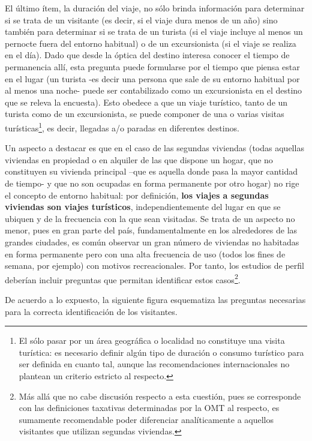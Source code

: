 \documentclass[
]{book}
\begin{document}
El último ítem, la duración del viaje, no sólo brinda información para determinar si se trata de un visitante (es decir, si el viaje dura menos de un año) sino también para determinar si se trata de un turista (si el viaje incluye al menos un pernocte fuera del entorno habitual) o de un excursionista (si el viaje se realiza en el día). Dado que desde la óptica del destino interesa conocer el tiempo de permanencia allí, esta pregunta puede formularse por el tiempo que piensa estar en el lugar (un turista -es decir una persona que sale de su entorno habitual por al menos una noche- puede ser contabilizado como un excursionista en el destino que se releva la encuesta). Esto obedece a que un viaje turístico, tanto de un turista como de un excursionista, se puede componer de una o varias visitas turísticas\footnote{El sólo pasar por un área geográfica o localidad no constituye una visita turística: es necesario definir algún tipo de duración o consumo turístico para ser definida en cuanto tal, aunque las recomendaciones internacionales no plantean un criterio estricto al respecto.}, es decir, llegadas a/o paradas en diferentes destinos.

Un aspecto a destacar es que en el caso de las segundas viviendas (todas aquellas viviendas en propiedad o en alquiler de las que dispone un hogar, que no constituyen su vivienda principal --que es aquella donde pasa la mayor cantidad de tiempo- y que no son ocupadas en forma permanente por otro hogar) no rige el concepto de entorno habitual: por definición, \textbf{los viajes a segundas viviendas son viajes turísticos}, independientemente del lugar en que se ubiquen y de la frecuencia con la que sean visitadas. Se trata de un aspecto no menor, pues en gran parte del país, fundamentalmente en los alrededores de las grandes ciudades, es común observar un gran número de viviendas no habitadas en forma permanente pero con una alta frecuencia de uso (todos los fines de semana, por ejemplo) con motivos recreacionales. Por tanto, los estudios de perfil deberían incluir preguntas que permitan identificar estos casos\footnote{Más allá que no cabe discusión respecto a esta cuestión, pues se corresponde con las definiciones taxativas determinadas por la OMT al respecto, es sumamente recomendable poder diferenciar analíticamente a aquellos visitantes que utilizan segundas viviendas.}.

De acuerdo a lo expuesto, la siguiente figura esquematiza las preguntas necesarias para la correcta identificación de los visitantes.
\end{document}
